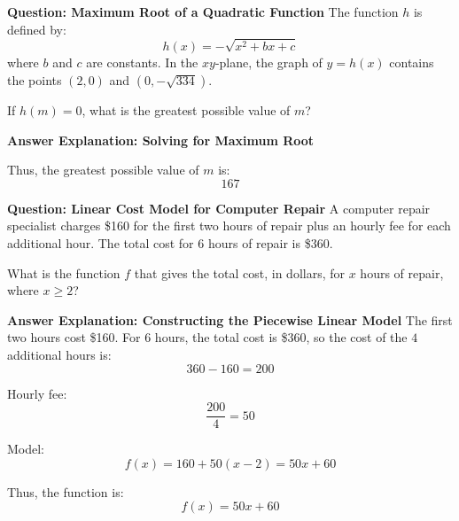 \documentclass{beamer}
\begin{document}
\begin{frame}{\textbf{Question: Maximum Root of a Quadratic Function}}
\small
The function $h$ is defined by:
\[
h(x) = -\sqrt{x^2+ bx + c} 
\]
where $b$ and $c$ are constants. In the $xy$-plane, the graph of $y = h(x)$ contains the points $(2, 0)$ and $\left( 0, -\sqrt{334} \right)$.

If $h(m) = 0$, what is the greatest possible value of $m$?
\end{frame}

\begin{frame}{\textbf{Answer Explanation: Solving for Maximum Root}}
\small


Thus, the greatest possible value of $m$ is:
\[
\boxed{167}
\]
\end{frame}

\begin{frame}{\textbf{Question: Linear Cost Model for Computer Repair}}
\small
A computer repair specialist charges \$160 for the first two hours of repair plus an hourly fee for each additional hour. The total cost for $6$ hours of repair is \$360.

What is the function $f$ that gives the total cost, in dollars, for $x$ hours of repair, where $x \geq 2$?
\end{frame}

\begin{frame}{\textbf{Answer Explanation: Constructing the Piecewise Linear Model}}
\small
The first two hours cost \$160. For $6$ hours, the total cost is \$360, so the cost of the $4$ additional hours is:
\[
360 - 160 = 200
\]

Hourly fee:
\[
\frac{200}{4} = 50
\]

Model:
\[
f(x) = 160 + 50(x - 2) = 50x + 60
\]

Thus, the function is:
\[
\boxed{f(x) = 50x + 60}
\]
\end{frame}
\end{document}
